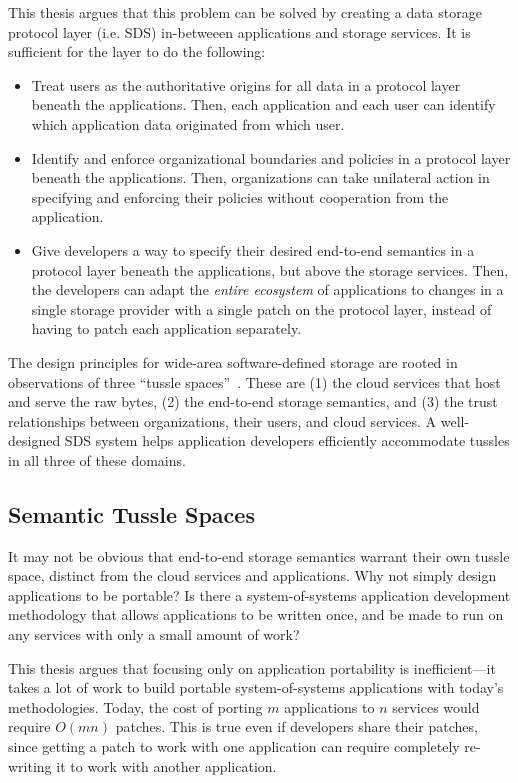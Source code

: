 This thesis argues that this problem can be solved by creating a data storage
protocol layer (i.e. SDS) in-betweeen applications and storage services.  It is sufficient
for the layer to do the following:

\begin{itemize}
   \item Treat users as the authoritative origins for all data in a protocol
      layer beneath the applications.  Then, each application and each user
      can identify which application data originated from which user.
   \item Identify and enforce organizational boundaries and policies in a protocol layer
      beneath the applications.  Then, organizations can take unilateral action
      in specifying and enforcing their policies without cooperation from the
      application.
   \item Give developers a way to specify their desired end-to-end semantics in
      a protocol layer beneath the applications, but above the storage services.
      Then, the developers can adapt the \emph{entire ecosystem} of applications
      to changes in a single storage provider with a
      single patch on the protocol layer,
      instead of having to patch each application separately.
\end{itemize}

The design principles for wide-area software-defined storage are rooted in 
observations of three ``tussle spaces''~\cite{david-clark-tussle-spaces}.
These are (1) the cloud services that host and serve the raw
bytes, (2) the end-to-end storage semantics, and (3) the trust
relationships between organizations, their users, and cloud services.
A well-designed SDS system helps application developers efficiently accommodate tussles
in all three of these domains.

\subsection{Semantic Tussle Spaces}

It may not be obvious that end-to-end storage semantics warrant their own tussle
space, distinct from the cloud services and applications.  Why not simply
design applications to be portable?  Is there a system-of-systems application
development methodology that allows applications to be written once, and be made
to run on any services with only a small amount of work?

This thesis argues that focusing only on application portability is
inefficient---it takes a lot of work to build portable system-of-systems
applications with today's methodologies.
Today, the cost of porting $m$ applications to $n$ services
would require $O(mn)$ patches.  This is true even if developers share their
patches, since getting a patch to work with one application can require completely
re-writing it to work with another application.

